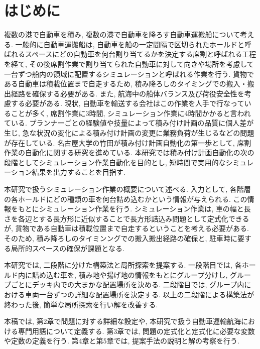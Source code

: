 \chapter{はじめに}

複数の港で自動車を積み, 複数の港で自動車を降ろす自動車運搬船について考える. 
一般的に自動車運搬船は, 自動車を船の一定間隔で区切られたホールドと呼ばれるスペースにどの自動車を何台割り当てるかを決定する席割と呼ばれる工程を経て, 
その後席割作業で割り当てられた自動車に対して向きや場所を考慮して一台ずつ船内の領域に配置するシミュレーションと呼ばれる作業を行う. 
貨物である自動車は積載位置まで自走するため, 積み降ろしのタイミングでの搬入・搬出経路を確保する必要がある. 
また, 航海中の船体バランス及び荷役安全性を考慮する必要がある. 
現状, 自動車を輸送する会社はこの作業を人手で行なっていることが多く, 席割作業に3時間, シミュレーション作業に4時間かかると言われている\cite{mitsui}. 
プランナーごとの経験値や技量によって積み付け計画の品質に個人差が生じ, 急な状況の変化による積み付け計画の変更に業務負荷が生じるなどの問題が存在している. 
名古屋大学の竹田が積み付け計画自動化の第一歩として, 席割作業の自動化に関する研究を進めている\cite{takeda}. 
本研究では積み付け計画自動化の次の段階としてシミュレーション作業自動化を目的とし, 短時間で実用的なシミュレーション結果を出力することを目指す.  

本研究で扱うシミュレーション作業の概要について述べる. 
入力として, 各階層の各ホールドにどの種類の車を何台詰め込むかという情報が与えられる. 
この情報をもとにシミュレーション作業を行う. 
シミュレーション作業は, 車の幅と長さを各辺とする長方形に近似することで長方形詰込み問題として定式化できるが, 貨物である自動車は積載位置まで自走するということを考える必要がある. 
そのため, 積み降ろしのタイミンングでの搬入搬出経路の確保と, 駐車時に要する局所的スペースの確保が課題となる. 

本研究では, 二段階に分けた構築法と局所探索を提案する. 
一段階目では, 各ホールド内に詰め込む車を, 積み地や揚げ地の情報をもとにグループ分けし, グループごとにデッキ内での大まかな配置場所を決める. 
二段階目では, グループ内における車両一台ずつの詳細な配置場所を決定する. 
以上の二段階による構築法が終わった後, 簡単な局所探索を行い解を改善する. 

本稿では, 第2章で問題に対する詳細な設定や, 本研究で扱う自動車運輸航海における専門用語について定義する. 
第3章では, 問題の定式化と定式化に必要な変数や定数の定義を行う. 
第4章と第5章では, 提案手法の説明と解の考察を行う. 

